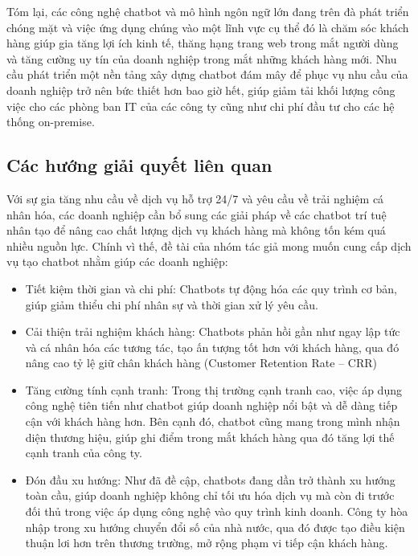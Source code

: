 Tóm lại, các công nghệ chatbot và mô hình ngôn ngữ lớn	đang trên đà phát triển chóng mặt và việc ứng dụng chúng vào một lĩnh vực cụ thể đó là chăm sóc khách hàng giúp gia tăng lợi ích kinh tế, thăng hạng trang web trong mắt người dùng và tăng cường uy tín của doanh nghiệp trong mắt những khách hàng mới. Nhu cầu phát triển một nền tảng xây dựng chatbot đám mây để phục vụ nhu cầu của doanh nghiệp trở nên bức thiết hơn bao giờ hết, giúp giảm tải khối lượng công việc cho các phòng ban IT của các công ty cũng như chi phí đầu tư cho các hệ thống on-premise.

\subsection{Các hướng giải quyết liên quan}

Với sự gia tăng nhu cầu về dịch vụ hỗ trợ 24/7 và yêu cầu về trải nghiệm cá nhân hóa, các doanh nghiệp cần bổ sung các giải pháp về các chatbot trí tuệ nhân tạo để nâng cao chất lượng dịch vụ khách hàng mà không tốn kém quá nhiều nguồn lực. Chính vì thế, đề tài của nhóm tác giả mong muốn cung cấp dịch vụ tạo chatbot nhằm giúp các doanh nghiệp:

\begin{itemize}
    \item Tiết kiệm thời gian và chi phí: Chatbots tự động hóa các quy trình cơ bản, giúp giảm thiểu chi phí nhân sự và thời gian xử lý yêu cầu.
    \item Cải thiện trải nghiệm khách hàng: Chatbots phản hồi gần như ngay lập tức và cá nhân hóa các tương tác, tạo ấn tượng tốt hơn với khách hàng, qua đó nâng cao tỷ lệ giữ chân khách hàng (Customer Retention Rate – CRR)  
    \item Tăng cường tính cạnh tranh: Trong thị trường cạnh tranh cao, việc áp dụng công nghệ tiên tiến như chatbot giúp doanh nghiệp nổi bật và dễ dàng tiếp cận với khách hàng hơn. Bên cạnh đó, chatbot cũng mang trong mình nhận diện thương hiệu, giúp ghi điểm trong mắt khách hàng qua đó tăng lợi thế cạnh tranh của công ty.
    \item Đón đầu xu hướng: Như đã đề cập, chatbots đang dần trở thành xu hướng toàn cầu, giúp doanh nghiệp không chỉ tối ưu hóa dịch vụ mà còn đi trước đối thủ trong việc áp dụng công nghệ vào quy trình kinh doanh. Công ty hòa nhập trong xu hướng chuyển đổi số của nhà nước, qua đó được tạo điều kiện thuận lơi hơn trên thương trường, mở rộng phạm vi tiếp cận khách hàng.
\end{itemize}


